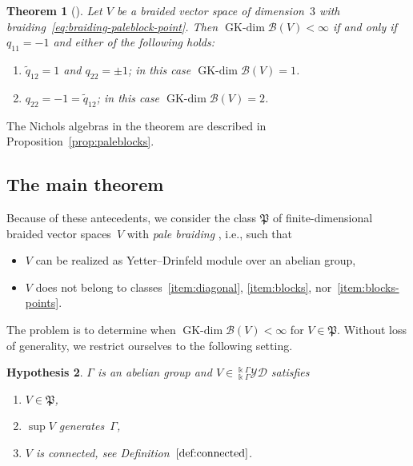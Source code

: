 \documentclass[10pt,a4paper]{amsart}
\numberwithin{equation}{section}
\newtheorem{Theorem}{Theorem}[section]
\newtheorem{hypothesis}[Theorem]{Hypothesis}
\newcommand{\GK}{\operatorname{GK-dim}}
\newcommand{\toba}{\mathscr B}
\newcommand{\pale}{\mathfrak{P}}
\newcommand{\yd}[1]{{}_{#1}^{#1}\mathcal{YD}}
\begin{document}
\begin{Theorem}[{\cite[Theorem 8.1.3]{AAH-triang}}]\label{th:paleblock-point-resumen}
Let $V$ be a braided vector space of dimension~$3$ with braiding~\eqref{eq:braiding-paleblock-point}.
Then $\GK \toba(V) < \infty$ if and only if
$q_{11} =-1$ and either of the following holds:
\begin{enumerate}[label=$(\roman*)$]\itemsep=0pt
\item%
$\widetilde{q}_{12} = 1$ and $q_{22} = \pm 1$; in this case $\GK \toba(V) = 1$.

\item%
$q_{22} = -1 = \widetilde{q}_{12}$; in this case $\GK \toba(V) = 2$.
\end{enumerate}
\end{Theorem}

The Nichols algebras in the theorem are described in Proposition~\ref{prop:paleblocks}.

\subsection{The main theorem}
Because of these antecedents, we consider the class $\pale$ of finite-dimensional braided vector spaces~$V$
with \emph{pale braiding} \cite{AAH-triang}, i.e., such that
\begin{itemize}\itemsep=0pt
\item $V$ can be realized as Yetter--Drinfeld module over an abelian group,
\item $V$ does not belong to classes~\ref{item:diagonal}, \ref{item:blocks}, nor~\ref{item:blocks-points}.
\end{itemize}

The problem is to determine when $\GK \toba(V) < \infty$ for $V \in \pale$.
Without loss of generality, we restrict ourselves to the following setting.
\begin{hypothesis}\label{hyp:pale}
$\Gamma$ is an abelian group and $V \in \yd{\Bbbk\Gamma}$ satisfies
\begin{enumerate}[label=\rm{(\Roman*)}]
\item\label{item:hyp-pale} $V \in \pale$,

\item\label{item:hyp-suppgen} $\sup V$ generates~$\Gamma$,

\item\label{item:hyp-connected} $V$ is connected, see Definition~$\ref{def:connected}$.
\end{enumerate}
\end{hypothesis}
\end{document}
